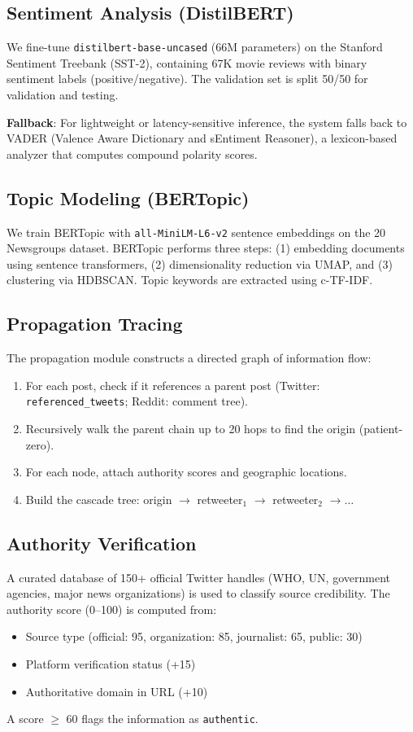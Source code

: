 \documentclass[12pt,a4paper]{article}
\begin{document}
\subsection{Sentiment Analysis (DistilBERT)}
We fine-tune \texttt{distilbert-base-uncased} (66M parameters) on the Stanford Sentiment Treebank (SST-2), containing 67K movie reviews with binary sentiment labels (positive/negative). The validation set is split 50/50 for validation and testing.

\textbf{Fallback}: For lightweight or latency-sensitive inference, the system falls back to VADER (Valence Aware Dictionary and sEntiment Reasoner), a lexicon-based analyzer that computes compound polarity scores.

\subsection{Topic Modeling (BERTopic)}
We train BERTopic with \texttt{all-MiniLM-L6-v2} sentence embeddings on the 20 Newsgroups dataset. BERTopic performs three steps: (1) embedding documents using sentence transformers, (2) dimensionality reduction via UMAP, and (3) clustering via HDBSCAN. Topic keywords are extracted using c-TF-IDF.

\subsection{Propagation Tracing}
The propagation module constructs a directed graph of information flow:
\begin{enumerate}
    \item For each post, check if it references a parent post (Twitter: \texttt{referenced\_tweets}; Reddit: comment tree).
    \item Recursively walk the parent chain up to 20 hops to find the origin (patient-zero).
    \item For each node, attach authority scores and geographic locations.
    \item Build the cascade tree: origin $\rightarrow$ retweeter$_1$ $\rightarrow$ retweeter$_2$ $\rightarrow \dots$
\end{enumerate}

\subsection{Authority Verification}
A curated database of 150+ official Twitter handles (WHO, UN, government agencies, major news organizations) is used to classify source credibility. The authority score (0--100) is computed from:
\begin{itemize}
    \item Source type (official: 95, organization: 85, journalist: 65, public: 30)
    \item Platform verification status (+15)
    \item Authoritative domain in URL (+10)
\end{itemize}
A score $\geq$ 60 flags the information as \texttt{authentic}.
\end{document}
